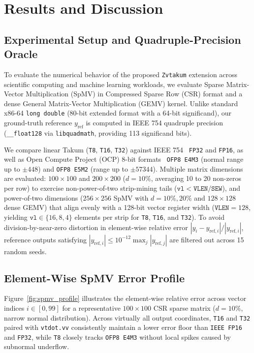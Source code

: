 \section{Results and Discussion}
\label{sec:results}

\subsection{Experimental Setup and Quadruple-Precision Oracle}
To evaluate the numerical behavior of the proposed \texttt{Zvtakum} extension across scientific computing and machine learning workloads, we evaluate Sparse Matrix-Vector Multiplication (SpMV) in Compressed Sparse Row (CSR) format and a dense General Matrix-Vector Multiplication (GEMV) kernel. Unlike standard x86-64 \texttt{long double} (80-bit extended format with a 64-bit significand), our ground-truth reference $y_{\text{ref}}$ is computed in IEEE 754 quadruple precision (\texttt{\_\_float128} via \texttt{libquadmath}, providing 113 significand bits).

We compare linear Takum (\texttt{T8}, \texttt{T16}, \texttt{T32}) against IEEE 754~\cite{ieee754} \texttt{FP32} and \texttt{FP16}, as well as Open Compute Project (OCP) 8-bit formats~\cite{ocp_fp8} \texttt{OFP8 E4M3} (normal range up to $\pm 448$) and \texttt{OFP8 E5M2} (range up to $\pm 57344$). Multiple matrix dimensions are evaluated: $100 \times 100$ and $200 \times 200$ ($d = 10\%$, averaging 10 to 20 non-zeros per row) to exercise non-power-of-two strip-mining tails ($\texttt{vl} < \texttt{VLEN}/\texttt{SEW}$), and power-of-two dimensions ($256 \times 256$ SpMV with $d = 10\%, 20\%$ and $128 \times 128$ dense GEMV) that align evenly with a 128-bit vector register width ($\texttt{VLEN} = 128$, yielding $\texttt{vl} \in \{16, 8, 4\}$ elements per strip for \texttt{T8}, \texttt{T16}, and \texttt{T32}). To avoid division-by-near-zero distortion in element-wise relative error $|y_i - y_{\text{ref},i}| / |y_{\text{ref},i}|$, reference outputs satisfying $|y_{\text{ref},i}| \le 10^{-12} \max_j |y_{\text{ref},j}|$ are filtered out across 15 random seeds.

\subsection{Element-Wise SpMV Error Profile}
Figure~\ref{fig:spmv_profile} illustrates the element-wise relative error across vector indices $i \in [0, 99]$ for a representative $100 \times 100$ CSR sparse matrix ($d = 10\%$, narrow normal distribution). Across virtually all output coordinates, \texttt{T16} and \texttt{T32} paired with \texttt{vtdot.vv} consistently maintain a lower error floor than \texttt{IEEE FP16} and \texttt{FP32}, while \texttt{T8} closely tracks \texttt{OFP8 E4M3} without local spikes caused by subnormal underflow.

